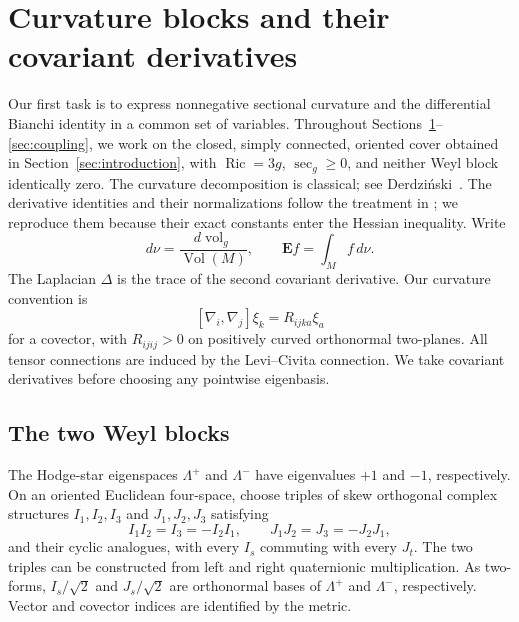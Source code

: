 \section{Curvature blocks and their covariant derivatives}
\label{sec:preliminaries}

Our first task is to express nonnegative sectional curvature and the
differential Bianchi identity in a common set of variables.
Throughout Sections~\ref{sec:preliminaries}--\ref{sec:coupling},
we work on the closed, simply connected, oriented cover obtained in
Section~\ref{sec:introduction}, with $\operatorname{Ric}=3g$,
$\sec_g\ge0$, and neither Weyl block identically zero.
The curvature decomposition is classical; see
Derdzi\'nski~\cite[Section~2]{Derdzinski1983}. The derivative identities
and their normalizations follow the treatment in
\cite[Lemmas~2.1--2.3 and Proposition~2.4]{OpenAI2026P}; we reproduce
them because their exact constants enter the Hessian inequality. Write
\[
 d\nu=\frac{d\operatorname{vol}_g}{\operatorname{Vol}(M)},
 \qquad \mathbf E f=\int_M f\,d\nu.
\]
The Laplacian $\Delta$ is the trace of the second covariant derivative.
Our curvature convention is
\[
 [\nabla_i,\nabla_j]\xi_k=R_{ijka}\xi_a
\]
for a covector, with $R_{ijij}>0$ on positively curved orthonormal
two-planes. All tensor connections are induced by the Levi--Civita
connection. We take covariant derivatives before choosing any
pointwise eigenbasis.

\subsection{The two Weyl blocks}

The Hodge-star eigenspaces $\Lambda^+$ and $\Lambda^-$ have eigenvalues
$+1$ and $-1$, respectively. On an oriented Euclidean four-space, choose
triples of skew orthogonal
complex structures $I_1,I_2,I_3$ and $J_1,J_2,J_3$ satisfying
\[
 I_1I_2=I_3=-I_2I_1,\qquad
 J_1J_2=J_3=-J_2J_1,
\]
and their cyclic analogues, with every $I_s$ commuting with every $J_t$.
The two triples can be constructed from left and right quaternionic
multiplication. As two-forms, $I_s/\sqrt2$ and $J_s/\sqrt2$ are
orthonormal bases of $\Lambda^+$ and $\Lambda^-$, respectively.
Vector and covector indices are identified by the metric.

